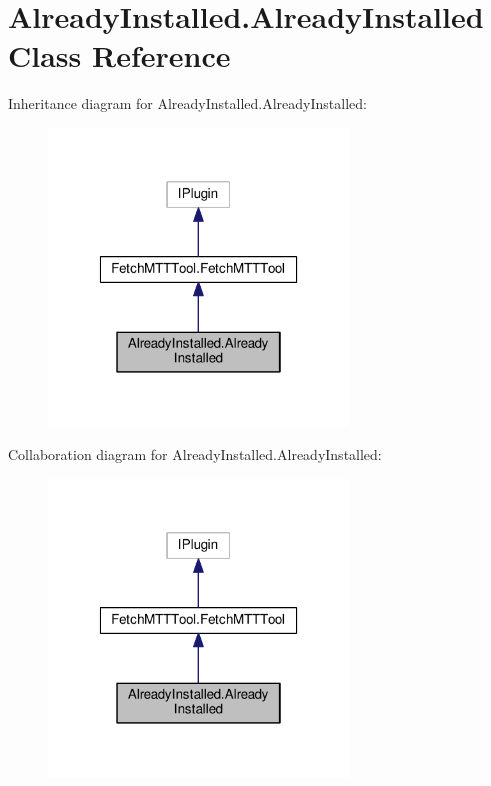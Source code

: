 \hypertarget{classAlreadyInstalled_1_1AlreadyInstalled}{\section{Already\-Installed.\-Already\-Installed Class Reference}
\label{classAlreadyInstalled_1_1AlreadyInstalled}
}


Inheritance diagram for Already\-Installed.\-Already\-Installed\-:
\nopagebreak
\begin{figure}[H]
\begin{center}
\leavevmode
\includegraphics[width=226pt]{classAlreadyInstalled_1_1AlreadyInstalled__inherit__graph}
\end{center}
\end{figure}


Collaboration diagram for Already\-Installed.\-Already\-Installed\-:
\nopagebreak
\begin{figure}[H]
\begin{center}
\leavevmode
\includegraphics[width=226pt]{classAlreadyInstalled_1_1AlreadyInstalled__coll__graph}
\end{center}
\end{figure}
